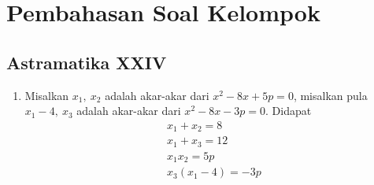 \chapter{Pembahasan Soal Kelompok}
\section{Astramatika XXIV}

\begin{enumerate}
\item Misalkan $x_1,\ x_2$ adalah akar-akar dari $x^2-8x+5p=0$, misalkan pula $x_1 - 4,\ x_3$ adalah akar-akar dari $x^2-8x-3p=0$. Didapat
	\begin{gather}
	x_1 + x_2 = 8\\
	x_1 + x_3 = 12\\
	x_1x_2 = 5p\\
	x_3(x_1-4) = -3p
	\end{gather}
\end{enumerate}
